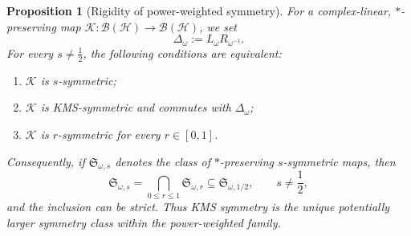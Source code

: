 \documentclass[11pt]{article}
\newtheorem{proposition}[proposition]{Proposition}
\theoremstyle{remark}
\newcommand{\1}{\mathbbm{1}}
\begin{document}
\begin{proposition}[Rigidity of power-weighted symmetry]
\label{prop:consolidated-power-weighted-rigidity}
For a complex-linear, $*$-preserving map
$\mathcal K:\mathcal B(\mathcal H)\to\mathcal B(\mathcal H)$, we set
\begin{equation}
 \Delta_\omega:=L_\omega R_{\omega^{-1}}.
\end{equation}
For every $s\neq\frac12$, the following conditions are equivalent:
\begin{enumerate}
 \item $\mathcal K$ is $s$-symmetric;
 \item $\mathcal K$ is KMS-symmetric and commutes with
       $\Delta_\omega$;
 \item $\mathcal K$ is $r$-symmetric for every $r\in[0,1]$.
\end{enumerate}
Consequently, if $\mathfrak S_{\omega,s}$ denotes the class of
$*$-preserving $s$-symmetric maps, then
\begin{equation}
 \mathfrak S_{\omega,s}
 =\bigcap_{0\leq r\leq1}\mathfrak S_{\omega,r}
 \subseteq \mathfrak S_{\omega,1/2},
 \qquad s\neq\frac12,
 \label{eq:consolidated-weighted-symmetry-hierarchy}
\end{equation}
and the inclusion can be strict.  Thus KMS symmetry is the unique
potentially larger symmetry class within the power-weighted family.
\end{proposition}
\end{document}
